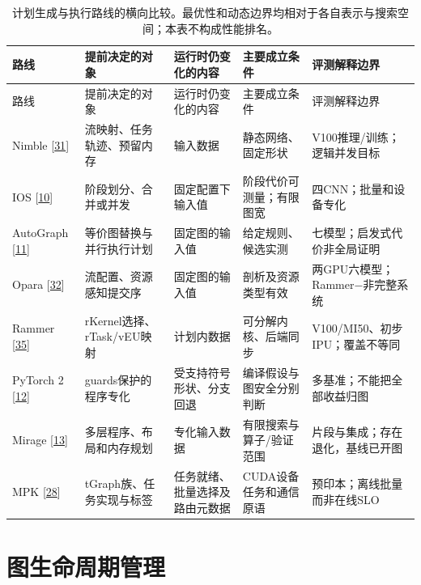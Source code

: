 \documentclass[
  UTF8,
  zihao=5]{ctexart}
\begin{document}
\begin{longtable}[]{@{}
  >{\raggedright\arraybackslash}p{}
  >{\raggedright\arraybackslash}p{}
  >{\raggedright\arraybackslash}p{}
  >{\raggedright\arraybackslash}p{}
  >{\raggedright\arraybackslash}p{}@{}}
\caption{计划生成与执行路线的横向比较。最优性和动态边界均相对于各自表示与搜索空间；本表不构成性能排名。}\tabularnewline
\toprule
路线 & 提前决定的对象 & 运行时仍变化的内容 & 主要成立条件 &
评测解释边界 \\
\midrule
\endfirsthead
\toprule
路线 & 提前决定的对象 & 运行时仍变化的内容 & 主要成立条件 &
评测解释边界 \\
\midrule
\endhead
Nimble {[}\protect\hyperlink{ref-kwon2020nimble}{31}{]} &
流映射、任务轨迹、预留内存 & 输入数据 & 静态网络、固定形状 &
V100推理/训练；逻辑并发目标 \\
IOS {[}\protect\hyperlink{ref-ding2021ios}{10}{]} & 阶段划分、合并或并发
& 固定配置下输入值 & 阶段代价可测量；有限图宽 & 四CNN；批量和设备专化 \\
AutoGraph {[}\protect\hyperlink{ref-zhao2023autograph}{11}{]} &
等价图替换与并行执行计划 & 固定图的输入值 & 给定规则、候选实测 &
七模型；启发式代价非全局证明 \\
Opara {[}\protect\hyperlink{ref-chen2025opara}{32}{]} &
流配置、资源感知提交序 & 固定图的输入值 & 剖析及资源类型有效 &
两GPU六模型；Rammer−非完整系统 \\
Rammer {[}\protect\hyperlink{ref-ma2020rammer}{35}{]} &
rKernel选择、rTask/vEU映射 & 计划内数据 & 可分解内核、后端同步 &
V100/MI50、初步IPU；覆盖不等同 \\
PyTorch 2 {[}\protect\hyperlink{ref-ansel2024pytorch2}{12}{]} &
guards保护的程序专化 & 受支持符号形状、分支回退 &
编译假设与图安全分别判断 & 多基准；不能把全部收益归图 \\
Mirage {[}\protect\hyperlink{ref-wu2025mirage}{13}{]} &
多层程序、布局和内存规划 & 专化输入数据 & 有限搜索与算子/验证范围 &
片段与集成；存在退化，基线已开图 \\
MPK {[}\protect\hyperlink{ref-cheng2026mpk}{28}{]} &
tGraph族、任务实现与标签 & 任务就绪、批量选择及路由元数据 &
CUDA设备任务和通信原语 & 预印本；离线批量而非在线SLO \\
\bottomrule
\end{longtable}

\hypertarget{lifecycle}{%
\section{图生命周期管理}\label{lifecycle}}
\end{document}
